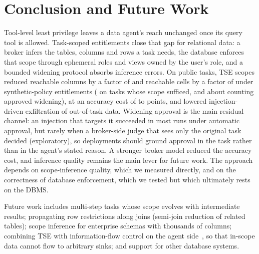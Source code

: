 \section{Conclusion and Future Work}
\label{sec:conclusion}
Tool-level least privilege leaves a data agent's reach unchanged once its query tool is allowed. Task-scoped
entitlements close that gap for relational data: a broker infers the tables, columns and rows a task needs, the
database enforces that scope through ephemeral roles and views owned by the user's role, and a bounded widening
protocol absorbs inference errors. On \nTasks{} public tasks, TSE scopes reduced reachable columns by a factor of
\oerColReduction{} and reachable cells by a factor of \oerCellReduction{} under synthetic-policy entitlements
(\oerCellReductionSuff{} on tasks whose scope sufficed, and about \oerCellRedPostSonnet{} counting approved widening),
at an accuracy cost of \dExHaikuTse{} to \dExSonnetTse{} points, and lowered injection-driven exfiltration of
out-of-task data. Widening approval is the main residual channel: an injection that targets it succeeded in most
runs under automatic approval, but rarely when a broker-side judge that sees only the original task decided
(exploratory), so deployments should ground approval in the task rather than in the agent's stated reason. A
stronger broker model reduced the accuracy cost, and inference quality remains the main lever for future work. The approach depends on scope-inference quality, which we measured directly, and on the
correctness of database enforcement, which we tested but which ultimately rests on the DBMS.

Future work includes multi-step tasks whose scope evolves with intermediate results; propagating row restrictions
along joins (semi-join reduction of related tables); scope inference for enterprise schemas with thousands of
columns; combining TSE with information-flow control on the agent side~\cite{costa2025fides,debenedetti2026camel},
so that in-scope data cannot flow to arbitrary sinks; and support for other database systems.
